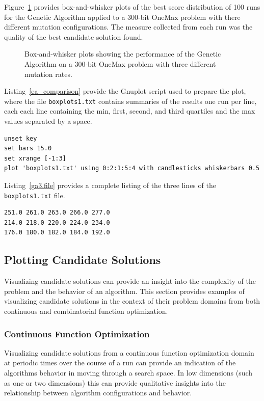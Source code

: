 Figure~\ref{plot:ga3} provides box-and-whisker plots of the best score distribution of 100 runs for the Genetic Algorithm applied to a 300-bit OneMax problem with there different mutation configurations. The measure collected from each run was the quality of the best candidate solution found. 

\begin{figure}[htp]
\centering

\caption{Box-and-whisker plots showing the performance of the Genetic Algorithm on a 300-bit OneMax problem with three different mutation rates.}
\label{plot:ga3}
\end{figure}

Listing~\ref{ea_comparison} provide the Gnuplot script used to prepare the plot, where the file \texttt{boxplots1.txt} contains summaries of the results one run per line, each each line containing the min, first, second, and third quartiles and the max values separated by a space.

\begin{lstlisting}[caption=Gnuplot script for creating a boxplot., label=ea_comparison]
unset key
set bars 15.0
set xrange [-1:3]
plot 'boxplots1.txt' using 0:2:1:5:4 with candlesticks whiskerbars 0.5
\end{lstlisting}

Listing~\ref{ga3.file} provides a complete listing of the three lines of the \texttt{boxplots1.txt} file.

\begin{lstlisting}[caption=Complete listing of the boxplots1.txt file., label=ga3.file]
251.0 261.0 263.0 266.0 277.0
214.0 218.0 220.0 224.0 234.0
176.0 180.0 182.0 184.0 192.0
\end{lstlisting}

%
%
\subsection{Plotting Candidate Solutions}
Visualizing candidate solutions can provide an insight into the complexity of the problem and the behavior of an algorithm.  This section provides examples of visualizing candidate solutions in the context of their problem domains from both continuous and combinatorial function optimization.

\subsubsection{Continuous Function Optimization}
Visualizing candidate solutions from a continuous function optimization domain at periodic times over the course of a run can provide an indication of the algorithms behavior in moving through a search space. In low dimensions (such as one or two dimensions) this can provide qualitative insights into the relationship between algorithm configurations and behavior.

